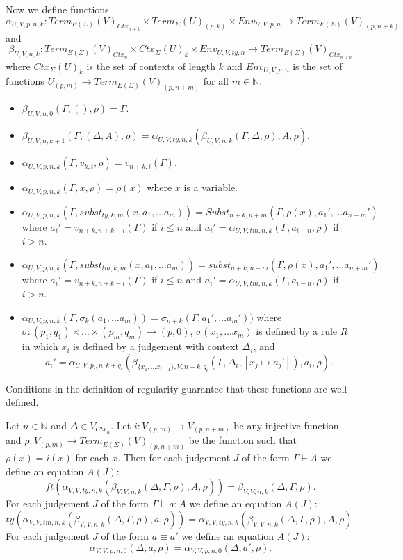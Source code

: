\documentclass{amsart}
\theoremstyle{definition}
\theoremstyle{remark}
\newcommand{\deq}{\equiv}
\numberwithin{figure}{section}
\begin{document}
Now we define functions
\[ \alpha_{U,V,p,n,k} : Term_{E(\Sigma)}(V)_{Ctx_{n+k}} \times Term_{\Sigma}(U)_{(p,k)} \times Env_{U,V,p,n} \to Term_{E(\Sigma)}(V)_{(p,n+k)} \]
and
\[ \beta_{U,V,n,k} : Term_{E(\Sigma)}(V)_{Ctx_n} \times Ctx_\Sigma(U)_k \times Env_{U,V,ty,n} \to Term_{E(\Sigma)}(V)_{Ctx_{n+k}} \]
where $Ctx_\Sigma(U)_k$ is the set of contexts of length $k$ and $Env_{U,V,p,n}$ is the set of functions $U_{(p,m)} \to Term_{E(\Sigma)}(V)_{(p,n+m)}$ for all $m \in \mathbb{N}$.
\begin{itemize}
\item $\beta_{U,V,n,0}(\Gamma, (), \rho) = \Gamma$.
\item $\beta_{U,V,n,k+1}(\Gamma, (\Delta,A), \rho) = \alpha_{U,V,ty,n,k}(\beta_{U,V,n,k}(\Gamma, \Delta, \rho), A, \rho)$.
\item $\alpha_{U,V,p,n,k}(\Gamma, v_{k,i}, \rho) = v_{n+k,i}(\Gamma)$.
\item $\alpha_{U,V,p,n,k}(\Gamma, x, \rho) = \rho(x)$ where $x$ is a variable.
\item $\alpha_{U,V,p,n,k}(\Gamma, subst_{ty,k,m}(x, a_1, \ldots a_m)) = Subst_{n+k,n+m}(\Gamma, \rho(x), a_1', \ldots a_{n+m}')$
    where $a_i' = v_{n+k,n+k-i}(\Gamma)$ if $i \leq n$ and $a_i' = \alpha_{U,V,tm,n,k}(\Gamma, a_{i-n}, \rho)$ if $i > n$.
\item $\alpha_{U,V,p,n,k}(\Gamma, subst_{tm,k,m}(x, a_1, \ldots a_m)) = subst_{n+k,n+m}(\Gamma, \rho(x), a_1', \ldots a_{n+m}')$
    where $a_i' = v_{n+k,n+k-i}(\Gamma)$ if $i \leq n$ and $a_i' = \alpha_{U,V,tm,n,k}(\Gamma, a_{i-n}, \rho)$ if $i > n$.
\item $\alpha_{U,V,p,n,k}(\Gamma, \sigma_k(a_1, \ldots a_m)) = \sigma_{n+k}(\Gamma, a_1', \ldots a_m'))$
    where $\sigma : (p_1,q_1) \times \ldots \times (p_m,q_m) \to (p,0)$,
    $\sigma(x_1, \ldots x_m)$ is defined by a rule $R$ in which $x_i$ is defined by a judgement with context $\Delta_i$, and
    \[ a_i' = \alpha_{U,V,p_i,n,k+q_i}(\beta_{\{ x_1, \ldots x_{i-1} \},V,n+k,q_i}(\Gamma, \Delta_i, [x_j \mapsto a_j']), a_i, \rho). \]
\end{itemize}
Conditions in the definition of regularity guarantee that these functions are well-defined.

Let $n \in \mathbb{N}$ and $\Delta \in V_{Ctx_n}$.
Let $i : V_{(p,m)} \to V_{(p,n+m)}$ be any injective function and $\rho : V_{(p,m)} \to Term_{E(\Sigma)}(V)_{(p,n+m)}$ be the function such that $\rho(x) = i(x)$ for each $x$.
Then for each judgement $J$ of the form $\Gamma \vdash A$ we define an equation $A(J)$:
\[ ft(\alpha_{V,V,ty,n,k}(\beta_{V,V,n,k}(\Delta, \Gamma, \rho), A, \rho)) = \beta_{V,V,n,k}(\Delta, \Gamma, \rho). \]
For each judgement $J$ of the form $\Gamma \vdash a : A$ we define an equation $A(J)$:
\[ ty(\alpha_{V,V,tm,n,k}(\beta_{V,V,n,k}(\Delta, \Gamma, \rho), a, \rho)) = \alpha_{V,V,ty,n,k}(\beta_{V,V,n,k}(\Delta, \Gamma, \rho), A, \rho). \]
For each judgement $J$ of the form $a \deq a'$ we define an equation $A(J)$:
\[ \alpha_{V,V,p,n,0}(\Delta, a, \rho) = \alpha_{V,V,p,n,0}(\Delta, a', \rho). \]
\end{document}
